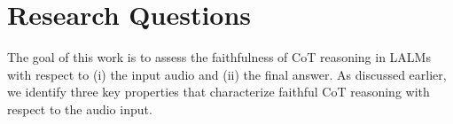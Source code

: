 
\section{Research Questions}


 The goal of this work is to assess the faithfulness of CoT reasoning in LALMs with respect to (i) the input audio and (ii) the final answer. As discussed earlier, we identify three key properties that characterize faithful CoT reasoning with respect to  the audio input.




